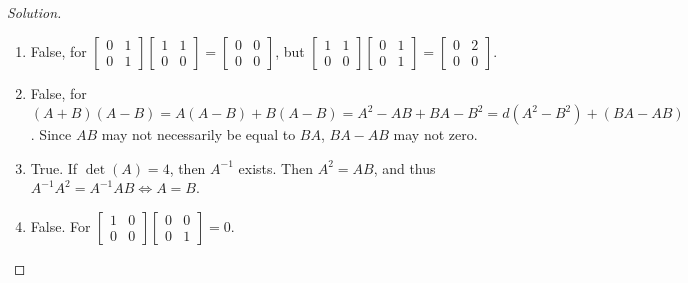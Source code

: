 \documentclass[oneside]{book}
\theoremstyle{mystyle}
\begin{document}
\begin{proof}[Solution]
\
\begin{enumerate}
    \item False, for $\begin{bmatrix} 0 & 1 \\ 0 & 1\end{bmatrix} \begin{bmatrix} 1 & 1 \\ 0 & 0 \end{bmatrix} = \begin{bmatrix} 0 & 0 \\ 0 & 0\end{bmatrix}$, but $\begin{bmatrix} 1 & 1 \\ 0 & 0 \end{bmatrix}\begin{bmatrix} 0 & 1 \\ 0 & 1\end{bmatrix}  = \begin{bmatrix} 0 & 2 \\ 0 & 0 \end{bmatrix}$.
    \item False, for $(A+B)(A-B) = A(A-B) + B(A-B) = A^2-AB+BA - B^2 =d (A^2-B^2) + (BA-AB)$. Since $AB$ may not necessarily be equal to $BA$, $BA-AB$ may not zero.
    \item True. If $\det(A) = 4$, then $A^{-1}$ exists. Then $A^2 = AB$, and thus $A^{-1}A^2  = A^{-1}AB \Leftrightarrow A = B$.
    \item False. For $\begin{bmatrix} 1 & 0 \\ 0 & 0 \end{bmatrix} \begin{bmatrix} 0 & 0 \\ 0 & 1 \end{bmatrix} = 0$.
\end{enumerate}
\end{proof}
\end{document}
